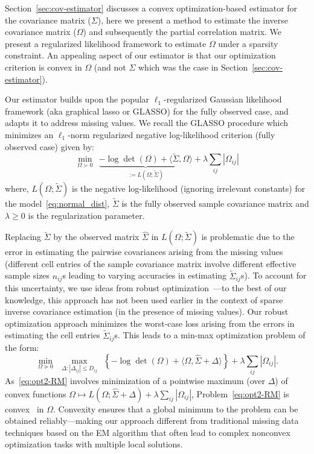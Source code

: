 Section~\ref{sec:cov-estimator} discusses a convex optimization-based estimator for the covariance matrix ($\Sigma$), here we present a method to estimate the inverse covariance matrix ($\Omega$) and subsequently the  partial correlation matrix. 
We present a regularized likelihood framework to estimate $\Omega$ under a sparsity constraint. An appealing aspect of our estimator is that our optimization criterion is 
convex in $\Omega$ (and not $\Sigma$ which was the case in Section~\ref{sec:cov-estimator}). 

Our estimator builds upon the popular $\ell_{1}$-regularized Gaussian likelihood
framework (aka graphical lasso or GLASSO\cite{friedman2008, witten2011, mazumder2012}) for the fully observed case, and 
adapts it to address missing values. We recall the GLASSO procedure which minimizes an $\ell_{1}$-norm regularized negative log-likelihood criterion (fully observed case) given by:
$$\min_{\Omega \succ 0}~~ \underbrace{-\log\det(\Omega) + \langle \tilde{\Sigma}, \Omega \rangle}_{:=L(\Omega; \tilde{\Sigma})} + \lambda \sum_{ij} |\Omega_{ij}|$$
where, $L(\Omega; \tilde{\Sigma})$ is the negative log-likelihood (ignoring irrelevant constants) for the model~\eqref{eq:normal_dist}, $\tilde{\Sigma}$ is the fully observed sample covariance matrix and $\lambda \geq 0$ is the regularization parameter. 

Replacing $\tilde{\Sigma}$ by the observed matrix $\hat{\Sigma}$ in $L(\Omega; \tilde{\Sigma})$ is problematic 
due to the error in estimating the pairwise covariances arising from the
missing values (different cell entries of the sample covariance matrix involve different effective sample sizes $n_{ij}$s leading to varying accuracies in estimating $\tilde{\Sigma}_{ij}$s). To account for this uncertainty, we use ideas from robust optimization~\cite{ben2009robust,bertsimas2011theory}---to the best of our knowledge, this approach has not been used earlier in the context of sparse inverse covariance estimation (in the presence of missing values).
Our robust optimization approach minimizes the worst-case loss arising from the errors in estimating the cell entries $\tilde{\Sigma}_{ij}$s. This leads to a min-max optimization problem of the form:
\begin{equation}\label{eq:opt2-RM}
    \min_{\Omega \succeq 0} ~~ \max_{\Delta: |\Delta_{ij}| \leq D_{ij}} ~~ 
    \left \{ -\log \det( \Omega) + \langle\Omega, \hat{\Sigma} + \Delta \rangle \right\} + \lambda \sum_{ij} |\Omega_{ij}| .
\end{equation}
As~\eqref{eq:opt2-RM} involves minimization of a pointwise maximum (over $\Delta$) of convex functions $\Omega \mapsto L(\Omega; \hat{\Sigma} + \Delta) + \lambda \sum_{ij} |\Omega_{ij}|$, Problem~\eqref{eq:opt2-RM} is convex~\cite{BV2004} in $\Omega$.
Convexity ensures that a global minimum to the problem can be obtained reliably---making our approach different from traditional missing data techniques based on the EM algorithm\cite{Dempster1977} that often lead to complex nonconvex optimization tasks with multiple local solutions. 

